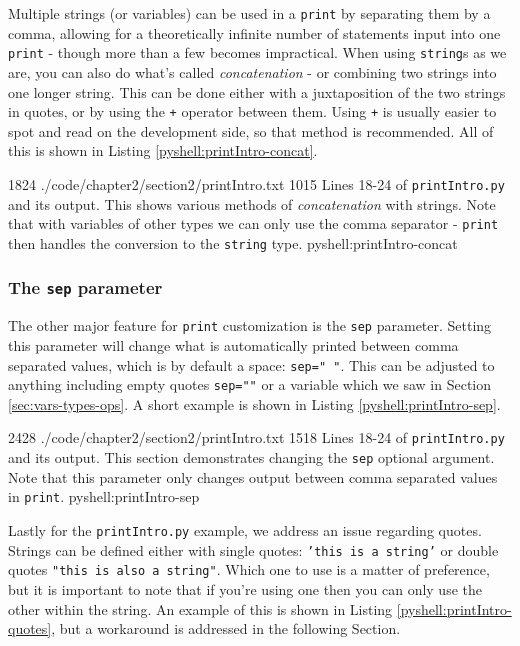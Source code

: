 \documentclass[oneside]{book}
\begin{document}
Multiple strings (or variables) can be used in a \texttt{print} by separating them by a comma, allowing for a theoretically infinite number of statements input into one \texttt{print} - though more than a few becomes impractical. When using \texttt{string}s as we are, you can also do what's called \emph{concatenation} - or combining two strings into one longer string. This can be done either with a juxtaposition of the two strings in quotes, or by using the \texttt{+} operator between them. Using \texttt{+} is usually easier to spot and read on the development side, so that method is recommended. All of this is shown in Listing \ref{pyshell:printIntro-concat}.

{18}{24}
{./code/chapter2/section2/printIntro.txt}
{10}{15}
{Lines 18-24 of \texttt{printIntro.py} and its output. This shows various methods of \textit{concatenation} with strings. Note that with variables of other types we can only use the comma separator - \texttt{print} then handles the conversion to the \texttt{string} type.}
{pyshell:printIntro-concat}

\subsubsection{The \texttt{sep} parameter}\label{sec:printSep}

The other major feature for \texttt{print} customization is the \texttt{sep} parameter. Setting this parameter will change what is automatically printed between comma separated values, which is by default a space: \texttt{sep=" "}. This can be adjusted to anything including empty quotes \texttt{sep=""} or a variable which we saw in Section \ref{sec:vars-types-ops}. A short example is shown in Listing \ref{pyshell:printIntro-sep}.

{24}{28}
{./code/chapter2/section2/printIntro.txt}
{15}{18}
{Lines 18-24 of \texttt{printIntro.py} and its output. This section demonstrates changing the \texttt{sep} optional argument. Note that this parameter only changes output between comma separated values in \texttt{print}.}
{pyshell:printIntro-sep}

Lastly for the \texttt{printIntro.py} example, we address an issue regarding quotes. Strings can be defined either with single quotes: \texttt{'this is a string'} or double quotes \texttt{"this is also a string"}. Which one to use is a matter of preference, but it is important to note that if you're using one then you can only use the other within the string. An example of this is shown in Listing \ref{pyshell:printIntro-quotes}, but a workaround is addressed in the following Section.
        
\end{document}

